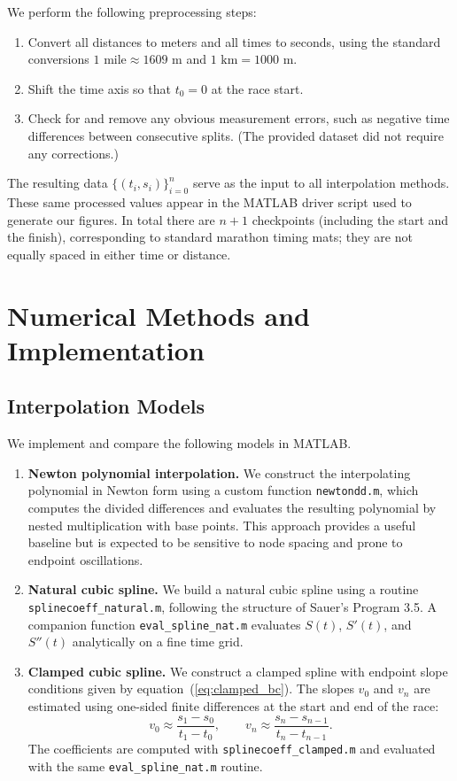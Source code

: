 \documentclass[12pt]{article}
\begin{document}
We perform the following preprocessing steps:
\begin{enumerate}
\item Convert all distances to meters and all times to seconds, using the
      standard conversions $1\text{ mile} \approx 1609\text{ m}$ and
      $1\text{ km} = 1000\text{ m}$.
\item Shift the time axis so that $t_0 = 0$ at the race start.
\item Check for and remove any obvious measurement errors, such as
      negative time differences between consecutive splits. (The
      provided dataset did not require any corrections.)
\end{enumerate}
The resulting data $\{(t_i, s_i)\}_{i=0}^n$ serve as the input to
all interpolation methods. These same processed values appear in the
MATLAB driver script used to generate our figures. In total there are
$n+1$ checkpoints (including the start and the finish), corresponding to
standard marathon timing mats; they are not equally spaced in either
time or distance.

\section{Numerical Methods and Implementation}

\subsection{Interpolation Models}

We implement and compare the following models in MATLAB.

\begin{enumerate}
\item \textbf{Newton polynomial interpolation.}
      We construct the interpolating polynomial in Newton form using
      a custom function \texttt{newtondd.m}, which computes the divided
      differences and evaluates the resulting polynomial by nested
      multiplication with base points. This approach provides a useful
      baseline but is expected to be sensitive to node spacing and prone
      to endpoint oscillations.

\item \textbf{Natural cubic spline.}
      We build a natural cubic spline using a routine
      \texttt{splinecoeff\_natural.m}, following the structure of
      Sauer's Program 3.5. A companion function \texttt{eval\_spline\_nat.m}
      evaluates $S(t)$, $S'(t)$, and $S''(t)$ analytically on a fine
      time grid.

\item \textbf{Clamped cubic spline.}
      We construct a clamped spline with endpoint slope conditions
      given by equation~(\ref{eq:clamped_bc}). The slopes $v_0$ and
      $v_n$ are estimated using one-sided finite differences at the
      start and end of the race:
      \[
        v_0 \approx \frac{s_1 - s_0}{t_1 - t_0}, \qquad
        v_n \approx \frac{s_n - s_{n-1}}{t_n - t_{n-1}}.
      \]
      The coefficients are computed with \texttt{splinecoeff\_clamped.m}
      and evaluated with the same \texttt{eval\_spline\_nat.m} routine.
\end{enumerate}
\end{document}
